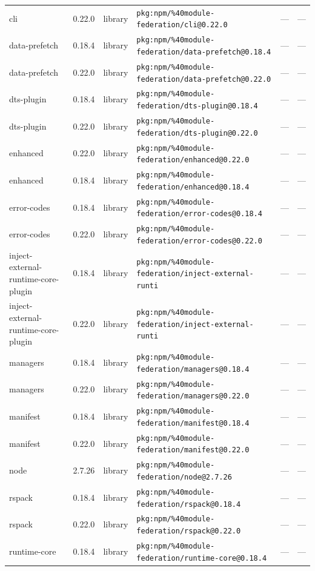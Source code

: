 \documentclass[11pt]{article}
\begin{document}
\begin{longtable}{|l|l|l|p{2.2cm}|l|p{4cm}|}
cli & 0.22.0 & library & \texttt{pkg:npm/\%40module-federation/cli@0.22.0} & — & — \\
data-prefetch & 0.18.4 & library & \texttt{pkg:npm/\%40module-federation/data-prefetch@0.18.4} & — & — \\
data-prefetch & 0.22.0 & library & \texttt{pkg:npm/\%40module-federation/data-prefetch@0.22.0} & — & — \\
dts-plugin & 0.18.4 & library & \texttt{pkg:npm/\%40module-federation/dts-plugin@0.18.4} & — & — \\
dts-plugin & 0.22.0 & library & \texttt{pkg:npm/\%40module-federation/dts-plugin@0.22.0} & — & — \\
enhanced & 0.22.0 & library & \texttt{pkg:npm/\%40module-federation/enhanced@0.22.0} & — & — \\
enhanced & 0.18.4 & library & \texttt{pkg:npm/\%40module-federation/enhanced@0.18.4} & — & — \\
error-codes & 0.18.4 & library & \texttt{pkg:npm/\%40module-federation/error-codes@0.18.4} & — & — \\
error-codes & 0.22.0 & library & \texttt{pkg:npm/\%40module-federation/error-codes@0.22.0} & — & — \\
inject-external-runtime-core-plugin & 0.18.4 & library & \texttt{pkg:npm/\%40module-federation/inject-external-runti} & — & — \\
inject-external-runtime-core-plugin & 0.22.0 & library & \texttt{pkg:npm/\%40module-federation/inject-external-runti} & — & — \\
managers & 0.18.4 & library & \texttt{pkg:npm/\%40module-federation/managers@0.18.4} & — & — \\
managers & 0.22.0 & library & \texttt{pkg:npm/\%40module-federation/managers@0.22.0} & — & — \\
manifest & 0.18.4 & library & \texttt{pkg:npm/\%40module-federation/manifest@0.18.4} & — & — \\
manifest & 0.22.0 & library & \texttt{pkg:npm/\%40module-federation/manifest@0.22.0} & — & — \\
node & 2.7.26 & library & \texttt{pkg:npm/\%40module-federation/node@2.7.26} & — & — \\
rspack & 0.18.4 & library & \texttt{pkg:npm/\%40module-federation/rspack@0.18.4} & — & — \\
rspack & 0.22.0 & library & \texttt{pkg:npm/\%40module-federation/rspack@0.22.0} & — & — \\
runtime-core & 0.18.4 & library & \texttt{pkg:npm/\%40module-federation/runtime-core@0.18.4} & — & — \\

\end{longtable}
\end{document}
